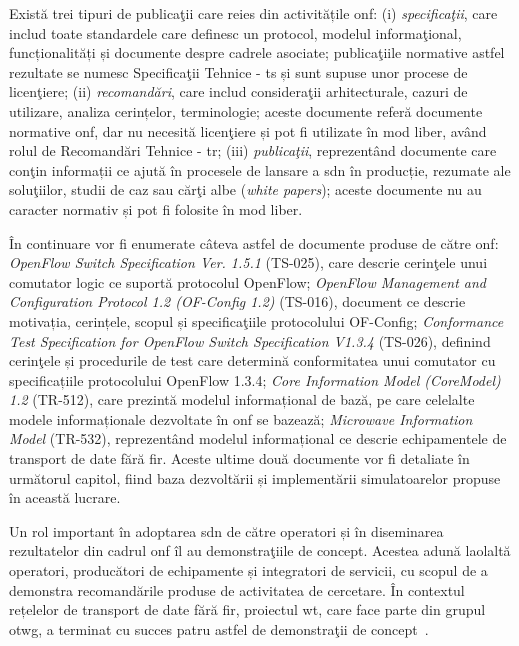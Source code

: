 Există trei tipuri de publicaţii care reies din activitățile \gls{onf}: (i) \textit{specificaţii}, care includ toate standardele care definesc un protocol, modelul informaţional, funcționalități și documente despre cadrele asociate; publicaţiile normative astfel rezultate se numesc Specificaţii Tehnice - \gls{ts} și sunt supuse unor procese de licenţiere; (ii) \textit{recomandări}, care includ consideraţii arhitecturale, cazuri de utilizare, analiza cerințelor, terminologie; aceste documente referă documente normative \gls{onf}, dar nu necesită licenţiere și pot fi utilizate în mod liber, având rolul de Recomandări Tehnice - \gls{tr}; (iii) \textit{publicaţii}, reprezentând documente care conţin informații ce ajută în procesele de lansare a \gls{sdn} în producție, rezumate ale soluţiilor, studii de caz sau cărţi albe (\textit{white papers}); aceste documente nu au caracter normativ și pot fi folosite în mod liber.

În continuare vor fi enumerate câteva astfel de documente produse de către \gls{onf}: \textit{OpenFlow Switch Specification Ver. 1.5.1} (TS-025), care descrie cerinţele unui comutator logic ce suportă protocolul OpenFlow; \textit{OpenFlow Management	and	Configuration Protocol 1.2 (OF-Config 1.2)} (TS-016), document ce descrie motivația, cerințele, scopul și specificaţiile protocolului OF-Config; \textit{Conformance Test Specification for OpenFlow Switch Specification V1.3.4} (TS-026), definind cerinţele și procedurile de test care determină conformitatea unui comutator cu specificațiile protocolului OpenFlow 1.3.4; \textit{Core Information Model (CoreModel) 1.2} (TR-512), care prezintă modelul informațional de bază, pe care celelalte modele informaționale dezvoltate în \gls{onf} se bazează; \textit{Microwave Information Model} (TR-532), reprezentând modelul informațional ce descrie echipamentele de transport de date fără fir. Aceste ultime două documente vor fi detaliate în următorul capitol, fiind baza dezvoltării și implementării simulatoarelor propuse în această lucrare.

Un rol important în adoptarea \gls{sdn} de către operatori și în diseminarea rezultatelor din cadrul \gls{onf} îl au demonstraţiile de concept. Acestea adună laolaltă operatori, producători de echipamente și integratori de servicii, cu scopul de a demonstra recomandările produse de activitatea de cercetare. În contextul rețelelor de transport de date fără fir, proiectul \gls{wt}, care face parte din grupul \gls{otwg}, a terminat cu succes patru astfel de demonstraţii de concept~\cite{onf2015_poc1, onf2016_poc2, onf2016_poc3}.

